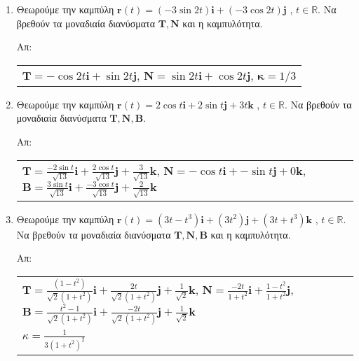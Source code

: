 


\usepackage{array}
\pagestyle{askhseis}
\everymath{\displaystyle}



\begin{center}
  \minibox{\large \bfseries \textcolor{Col1}{Ασκήσεις Καμπύλες - Τρίεδρο Frenet}}
\end{center}

\vspace{\baselineskip}

\begin{enumerate}
  \item Θεωρούμε την καμπύλη $\mathbf{r}(t) = (-3\sin 2t) \mathbf{i} + (-3\cos 2t)
    \mathbf{j}$ , $t\in\mathbb{R}$. 
    Να βρεθούν τα μοναδιαία διανύσματα $\mathbf{T},\mathbf{N}$ και η καμπυλότητα.

    \hfill Απ: \begin{tabular}{l}
      $ \mathbf{T} = -\cos 2t \mathbf{i} + \sin 2t \mathbf{j} $, \quad 
      $ \mathbf{N} = \sin 2t \mathbf{i} + \cos 2t \mathbf{j} $, \quad
      $ \mathbf{\kappa} = {1}/{3} $
    \end{tabular}

  \item Θεωρούμε την καμπύλη $\mathbf{r}(t) = 2\cos t \mathbf{i} + 2\sin t \mathbf{j}+ 
    3t \mathbf{k}$ , $t\in\mathbb{R}$. Να βρεθούν τα μοναδιαία διανύσματα 
    $\mathbf{T},\mathbf{N},\mathbf{B}$.

    \hfill Απ: 
    \begin{tabular}{l}
      $\mathbf{T} = \frac{-2\sin t}{\sqrt{13}} \mathbf{i} + \frac{2\cos t}{\sqrt{13}} 
      \mathbf{j} + \frac{3}{\sqrt{13}} \mathbf{k}$, \quad
      $ \mathbf{N} = -\cos t \mathbf{i} + -\sin t \mathbf{j} + 0 \mathbf{k}$, \quad
      $\mathbf{B} = \frac{3\sin t}{\sqrt{13}} \mathbf{i} + \frac{-3\cos
      t}{\sqrt{13}} \mathbf{j} + \frac{2}{\sqrt{13}} \mathbf{k}$
    \end{tabular}

  \item Θεωρούμε την καμπύλη $ \mathbf{r}(t) = (3t-t^3)\mathbf{i}+(3t^2)\mathbf{j}+
    (3t+t^3)\mathbf{k} $ , $t\in\mathbb{R}$. 
    Να βρεθούν τα μοναδιαία διανύσματα $\mathbf{T},\mathbf{N}, \mathbf{B}$ 
    και η καμπυλότητα.

    \hfill Απ: 
    \begin{tabular}{l}
      $\mathbf{T}=\frac{(1-t^2)}{\sqrt{2}(1+t^2)}\mathbf{i}+\frac{2t}{\sqrt{2}(1+t^2)}\mathbf{j}+\frac{1}{\sqrt{2}} \mathbf{k}$, $\mathbf{N}=
      \frac{-2t}{1+t^2}\mathbf{i}+\frac{1-t^2}{1+t^2}\mathbf{j}$,
      $\mathbf{B}=\frac{t^2-1}{\sqrt{2}(1+t^2)}\mathbf{i}+\frac{-2t}{\sqrt{2}(1+t^2)}\mathbf{j}+\frac{1}{\sqrt{2}}
      \mathbf{k}$ \\
      $\kappa = \frac{1}{3(1+t^2)^2}$
    \end{tabular}


\end{enumerate}
